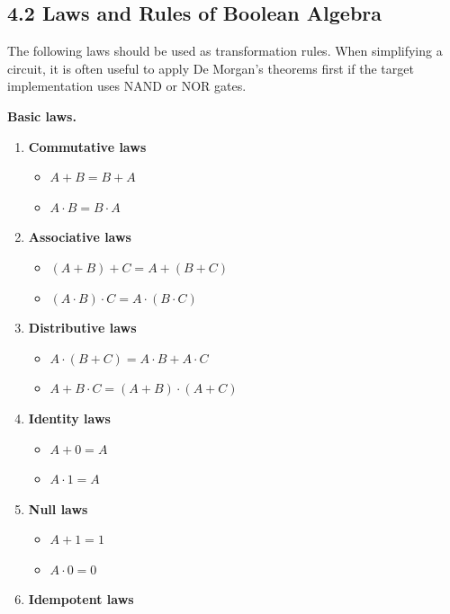 \documentclass[11pt,a4paper]{article}
\providecommand{\tightlist}{\setlength{\itemsep}{1pt}\setlength{\parskip}{0pt}}
\begin{document}
\subsection{4.2 Laws and Rules of Boolean
Algebra}\label{laws-and-rules-of-boolean-algebra}

The following laws should be used as transformation rules. When
simplifying a circuit, it is often useful to apply De Morgan's theorems
first if the target implementation uses NAND or NOR gates.

\textbf{Basic laws.}

\begin{enumerate}
\def\labelenumi{\arabic{enumi}.}
\tightlist
\item
  \textbf{Commutative laws}

  \begin{itemize}
  \tightlist
  \item
    \(A + B = B + A\)
  \item
    \(A \cdot B = B \cdot A\)
  \end{itemize}
\item
  \textbf{Associative laws}

  \begin{itemize}
  \tightlist
  \item
    \((A + B) + C = A + (B + C)\)
  \item
    \((A \cdot B) \cdot C = A \cdot (B \cdot C)\)
  \end{itemize}
\item
  \textbf{Distributive laws}

  \begin{itemize}
  \tightlist
  \item
    \(A \cdot (B + C) = A \cdot B + A \cdot C\)
  \item
    \(A + B \cdot C = (A + B) \cdot (A + C)\)
  \end{itemize}
\item
  \textbf{Identity laws}

  \begin{itemize}
  \tightlist
  \item
    \(A + 0 = A\)
  \item
    \(A \cdot 1 = A\)
  \end{itemize}
\item
  \textbf{Null laws}

  \begin{itemize}
  \tightlist
  \item
    \(A + 1 = 1\)
  \item
    \(A \cdot 0 = 0\)
  \end{itemize}
\item
  \textbf{Idempotent laws}


\end{enumerate}
\end{document}
